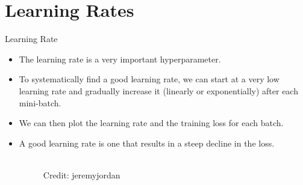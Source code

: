 
\section{Learning Rates}

\begin{frame} {Learning Rate}
  \begin{itemize}
    \item The learning rate is a very important hyperparameter.
    \item To systematically find a good learning rate, we can start at a very low learning rate and gradually increase it (linearly or exponentially) after each mini-batch.
    \item We can then plot the learning rate and the training loss for each batch.
    \item A good learning rate is one that results in a steep decline in the loss.
    \begin{figure}
    \centering
      \tiny{\\Credit: jeremyjordan}
    \end{figure}
  \end{itemize}
\end{frame}



